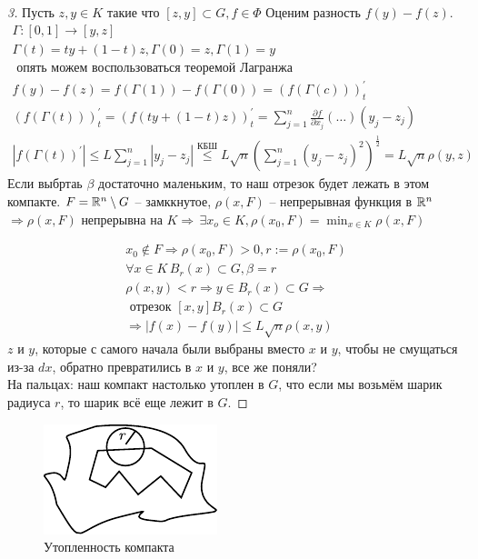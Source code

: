 \documentclass[document]{subfiles}
\begin{document}
\begin{proof}[3]
    Пусть $z, y \in K$ такие что $[z,y] \subset G, f \in \Phi$ 
Оценим разность $f(y) - f(z)$. 
    \begin{gather*}
        \Gamma: [0,1] \rightarrow [y,z] \\
        \Gamma(t) = ty + (1-t)z, \Gamma(0) = z, \Gamma(1) = y \\
        \text{ опять можем воспользоваться теоремой Лагранжа } \\
        f(y) - f(z) = f(\Gamma(1)) - f(\Gamma(0)) = (f(\Gamma(c)))^\prime_t \\
        (f(\Gamma(t)))^\prime_t = (f(ty + (1-t)z))^\prime_t = \sum^n_{j=1} \frac{\partial f}{\partial x_j} (\ldots) (y_j - z_j) \\
        |f(\Gamma(t))^\prime| \leq L \sum^n_{j=1} |y_j - z_j| \stackrel{\text{КБШ}}{\leq} L\sqrt{n} \left( \sum^n_{j=1} (y_j - z_j)^2 \right)^\frac{1}{2} = L \sqrt{n} \rho(y,z)
    \end{gather*}
    Если выбртаь $\beta$ достаточно маленьким, то наш отрезок будет лежать в этом компакте. $F = \mathbb{R}^n \setminus G$ -- замккнутое, $\rho(x,F)$ -- непрерывная функция  в 
    $\mathbb{R}^n$ $\Rightarrow \rho(x,F)$ непрерывна на $K \Rightarrow \, \exists x_o \in K, \rho(x_0,F) = \min_{x \in K} \rho(x,F)$

    \begin{gather*}
        x_0 \notin F \Rightarrow \rho(x_0, F) > 0, r := \rho(x_0, F) \\
        \forall x \in K \, B_r(x) \subset G, \beta = r \\
        \rho(x,y) < r \Rightarrow y \in B_r(x) \subset G \Rightarrow \\
        \text{ отрезок } [x,y] B_r(x) \subset G \\
        \Rightarrow |f(x) - f(y)| \leq L \sqrt{n} \rho(x,y)
    \end{gather*}
    $z$ и $y$, которые с самого начала были выбраны вместо $x$ и $y$, чтобы не смущаться из-за $dx$, обратно превратились в $x$ и $y$, все же поняли? \\
    На пальцах: наш компакт настолько утоплен в $G$, что если мы возьмём шарик радиуса $r$, то шарик всё еще лежит в $G$.
\end{proof}

\begin{figure}
    \centering
    \includegraphics*{images/chapter4/compact.pdf}\caption{Утопленность компакта}
\end{figure}
\end{document}
